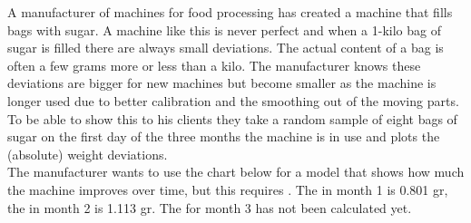 \setcounter{chapter}{3}
\setcounter{section}{2}
\setcounter{question}{0}



A manufacturer of machines for food processing has created a machine that fills bags with sugar. A machine like this is never perfect and when a 1-kilo bag of sugar is filled there are always small deviations. The actual content of a bag is often a few grams more or less than a kilo. The manufacturer knows these deviations are bigger for new machines but become smaller as the machine is longer used due to better calibration and the smoothing out of the moving parts. To be able to show this to his clients they take a random sample of eight bags of sugar on the first day of the three months the machine is in use and plots the (absolute) weight deviations. \\

The manufacturer wants to use the chart below for a model that shows how much the machine improves over time, but this requires . The  in month 1 is 0.801 gr, the  in month 2 is 1.113 gr. The  for month 3 has not been calculated yet. \\

